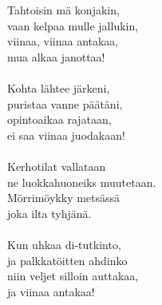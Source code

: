 
            Tahtoisin mä konjakin, \\
            vaan kelpaa mulle jallukin, \\
            viinaa, viinaa antakaa, \\
            mua alkaa janottaa! \\
\hspace{10mm} \\
            Kohta lähtee järkeni, \\
            puristaa vanne päätäni, \\
            opintoaikaa rajataan, \\
            ei saa viinaa juodakaan! \\
\hspace{10mm} \\
            Kerhotilat vallataan \\
            ne luokkahuoneiks muutetaan. \\
            Mörrimöykky metsässä \\
            joka ilta tyhjänä. \\
\hspace{10mm} \\
            Kun uhkaa di-tutkinto, \\
            ja palkkatöitten ahdinko \\
            niin veljet silloin auttakaa, \\
            ja viinaa antakaa! \\
